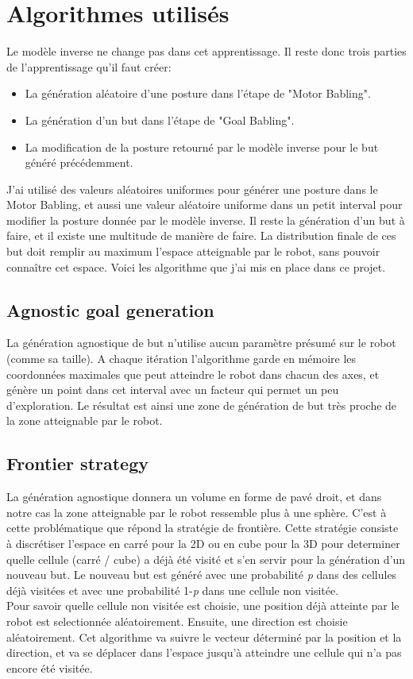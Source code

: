 \documentclass{article}
\begin{document}
\section*{Algorithmes utilisés}

Le modèle inverse ne change pas dans cet apprentissage. Il reste donc trois parties de l'apprentissage qu'il faut créer:
\begin{itemize}
    \item La génération aléatoire d'une posture dans l'étape de "Motor Babling".
    \item La génération d'un but dans l'étape de "Goal Babling".
    \item La modification de la posture retourné par le modèle inverse pour le but généré précédemment.
\end{itemize}
J'ai utilisé des valeurs aléatoires uniformes pour générer une posture dans le Motor Babling, et aussi une valeur aléatoire uniforme dans un petit interval pour modifier la posture donnée par le modèle inverse. Il reste la génération d'un but à faire, et il existe une multitude de manière de faire. La distribution finale de ces but doit remplir au maximum l'espace atteignable par le robot, sans pouvoir connaître cet espace. Voici les algorithme que j'ai mis en place dans ce projet.

\subsection*{Agnostic goal generation}

La génération agnostique de but n'utilise aucun paramètre présumé sur le robot (comme sa taille). A chaque itération l'algorithme garde en mémoire les coordonnées maximales que peut atteindre le robot dans chacun des axes, et génère un point dans cet interval avec un facteur qui permet un peu d'exploration. Le résultat est ainsi une zone de génération de but très proche de la zone atteignable par le robot.

\subsection*{Frontier strategy}

La génération agnostique donnera un volume en forme de pavé droit, et dans notre cas la zone atteignable par le robot ressemble plus à une sphère. C'est à cette problématique que répond la stratégie de frontière. Cette stratégie consiste à discrétiser l'espace en carré pour la 2D ou en cube pour la 3D pour determiner quelle cellule (carré / cube)  a déjà été visité et s'en servir pour la génération d'un nouveau but. Le nouveau but est généré avec une probabilité \emph{p} dans des cellules déjà visitées et avec une probabilité 1-\emph{p} dans une cellule non visitée.\\
Pour savoir quelle cellule non visitée est choisie, une position déjà atteinte par le robot est selectionnée aléatoirement. Ensuite, une direction est choisie aléatoirement. Cet algorithme va suivre le vecteur déterminé par la position et la direction, et va se déplacer dans l'espace jusqu'à atteindre une cellule qui n'a pas encore été visitée.
\end{document}
